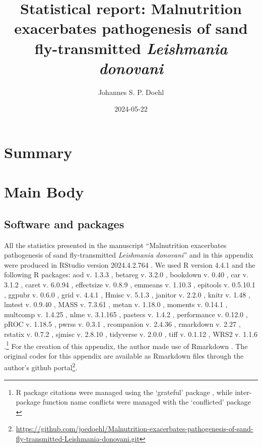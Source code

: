 \documentclass[
  12pt,
  letterpaper,
]{article}
\title{Statistical report: Malnutrition exacerbates pathogenesis of sand fly-transmitted \emph{Leishmania donovani}}
\author{Johannes S. P. Doehl}
\date{2024-05-22}
\DeclareRobustCommand{\href}[2]{#2\footnote{\url{#1}}}
\begin{document}
\maketitle

\section{Summary}\label{summary}

\section{Main Body}\label{main-body}

\subsection{Software and packages}\label{software-and-packages}

All the statistics presented in the manuscript ``Malnutrition exacerbates pathogenesis of sand fly-transmitted \emph{Leishmania donovani}'' and in this appendix were produced in RStudio version 2024.4.2.764 \autocite{team2023}. We used R version 4.4.1 \autocite{base} and the following R packages: aod v. 1.3.3 \autocite{aod}, betareg v. 3.2.0 \autocite{betareg2010,betareg2012,betareg2024}, bookdown v. 0.40 \autocite{bookdown2016,bookdown2024}, car v. 3.1.2 \autocite{car}, caret v. 6.0.94 \autocite{caret}, effectsize v. 0.8.9 \autocite{effectsize}, emmeans v. 1.10.3 \autocite{emmeans}, epitools v. 0.5.10.1 \autocite{epitools}, ggpubr v. 0.6.0 \autocite{ggpubr}, grid v. 4.4.1 \autocite{grid}, Hmisc v. 5.1.3 \autocite{Hmisc}, janitor v. 2.2.0 \autocite{janitor}, knitr v. 1.48 \autocite{knitr2014,knitr2015,knitr2024}, lmtest v. 0.9.40 \autocite{lmtest}, MASS v. 7.3.61 \autocite{MASS}, metan v. 1.18.0 \autocite{metan}, moments v. 0.14.1 \autocite{moments}, multcomp v. 1.4.25 \autocite{multcomp}, nlme v. 3.1.165 \autocite{nlme2000,nlme2024}, pastecs v. 1.4.2 \autocite{pastecs}, performance v. 0.12.0 \autocite{performance}, pROC v. 1.18.5 \autocite{pROC}, pwrss v. 0.3.1 \autocite{pwrss}, rcompanion v. 2.4.36 \autocite{rcompanion}, rmarkdown v. 2.27 \autocite{rmarkdown2018,rmarkdown2020,rmarkdown2024}, rstatix v. 0.7.2 \autocite{rstatix}, sjmisc v. 2.8.10 \autocite{sjmisc}, tidyverse v. 2.0.0 \autocite{tidyverse}, tiff v. 0.1.12 \autocite{tiff}, WRS2 v. 1.1.6 \autocite{WRS2}.\footnote{R package citations were managed using the `grateful' package \autocite{grateful}, while inter-package function name conflicts were managed with the `conflicted' package \autocite{conflicted}} For the creation of this appendix, the author made use of Rmarkdown \autocite{allaire2024}. The original codes for this appendix are available as Rmarkdown files through the author's \href{https://github.com/joedoehl/Malnutrition-exacerbates-pathogenesis-of-sand-fly-transmitted-Leishmania-donovani.git}{github portal}.
\end{document}
